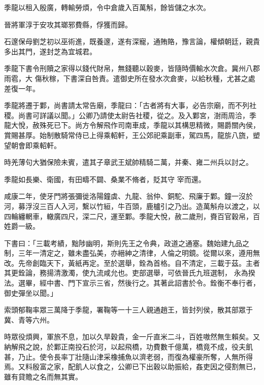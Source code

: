 \begin{pinyinscope}
 季龍以租入殷廣，轉輸勞煩，令中倉歲入百萬斛，餘皆儲之水次。



 晉將軍淳于安攻其瑯邪費縣，俘獲而歸。



 石邃保母劉芝初以巫術進，既養邃，遂有深寵，通賄賂，豫言論，權傾朝廷，親貴多出其門，遂封芝為宜城君。



 季龍下書令刑贖之家得以錢代財帛，無錢聽以穀麥，皆隨時價輸水次倉。冀州八郡雨雹，大
 傷秋稼，下書深自咎責。遣御史所在發水次倉麥，以給秋種，尤甚之處差復一年。



 季龍將遷于鄴，尚書請太常告廟，季龍曰：「古者將有大事，必告宗廟，而不列社稷。尚書可詳議以聞。」公卿乃請使太尉告社稷，從之。及入鄴宮，澍雨周洽，季龍大悅，赦殊死已下。尚方令解飛作司南車成，季龍以其構思精微，賜爵關內侯，賞賜甚厚。始制散騎常侍已上得乘軺軒，王公郊祀乘副車，駕四馬，龍旂八旒，塑望朝會即乘軺軒。



 時羌薄句大猶保險未賓，遣其子章武王斌帥精騎二萬，并秦、雍二州兵以討之。



 季龍如長樂、衛國，有田疇不闢、桑業不脩者，貶其守
 宰而還。



 咸康二年，使牙門將張彌徙洛陽鐘虡、九龍、翁仲、銅駝、飛廉于鄴。鐘一沒於河，募浮沒三百人入河，繫以竹絙，牛百頭，鹿櫨引之乃出。造萬斛舟以渡之，以四輪纏輞車，轍廣四尺，深二尺，運至鄴。季龍大悅，赦二歲刑，賚百官穀帛，百姓爵一級。



 下書曰：「三載考績，黜陟幽明，斯則先王之令典，政道之通塞。魏始建九品之制，三年一清定之，雖未盡弘美，亦縉紳之清律，人倫之明鏡。從爾以來，遵用無改。先帝創臨天下，黃紙再定。至於選舉，銓為首格。自不清定，三載于茲。主者其更銓論，務揚清激濁，使九流咸允也。吏部選舉，可依晉氏九班選制，
 永為揆法。選畢，經中書、門下宣示三省，然後行之。其著此詔書於令。銓衡不奉行者，御史彈坐以聞。」



 索頭郁鞠率眾三萬降于季龍，署鞠等一十三人親通趙王，皆封列侯，散其部眾于冀、青等六州。



 時眾役煩興，軍旅不息，加以久旱穀貴，金一斤直米二斗，百姓嗷然無生賴矣。又納解飛之說，於鄴正南投石於河，以起飛橋，功費數千億萬，橋竟不成，役夫飢甚，乃止。使令長率丁壯隨山津采橡捕魚以濟老弱，而復為權豪所奪，人無所得焉。又料殷富之家，配飢人以食之，公卿已下出穀以助振給，姦吏因之侵割無已，雖有貸贍之名而無其實。




\end{pinyinscope}
